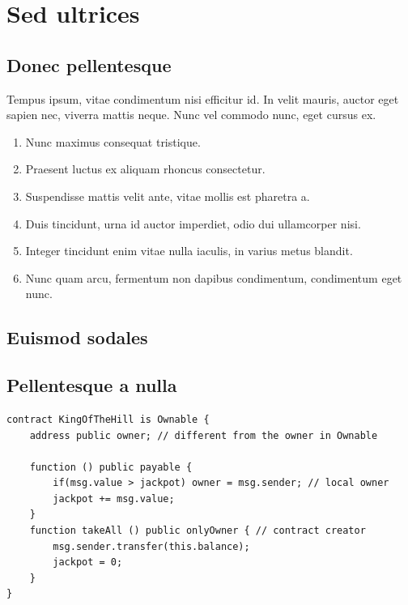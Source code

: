 \newpage 
\section{Sed ultrices} \label{sec:sed-ultrices}

\subsection{Donec pellentesque}

Tempus ipsum, vitae condimentum nisi efficitur id. In velit mauris, auctor eget
sapien nec, viverra mattis neque. Nunc vel commodo nunc, eget cursus ex.

\begin{enumerate}
\item{Nunc maximus consequat tristique.}
\item{Praesent luctus ex aliquam rhoncus consectetur.}
\item{Suspendisse mattis velit ante, vitae mollis est pharetra a.}
\item{Duis tincidunt, urna id auctor imperdiet, odio dui ullamcorper nisi.}
\item{Integer tincidunt enim vitae nulla iaculis, in varius metus blandit.}
\item{Nunc quam arcu, fermentum non dapibus condimentum, condimentum eget nunc.}
\end{enumerate}

\subsection{Euismod sodales}

\begin{outline}
\lipsum[2]
\end{outline}

\subsection{Pellentesque a nulla}

\begin{lstlisting}[language=Solidity]
contract KingOfTheHill is Ownable {
    address public owner; // different from the owner in Ownable

    function () public payable {
        if(msg.value > jackpot) owner = msg.sender; // local owner
        jackpot += msg.value;
    }
    function takeAll () public onlyOwner { // contract creator
        msg.sender.transfer(this.balance);
        jackpot = 0;
    }
}
\end{lstlisting}
